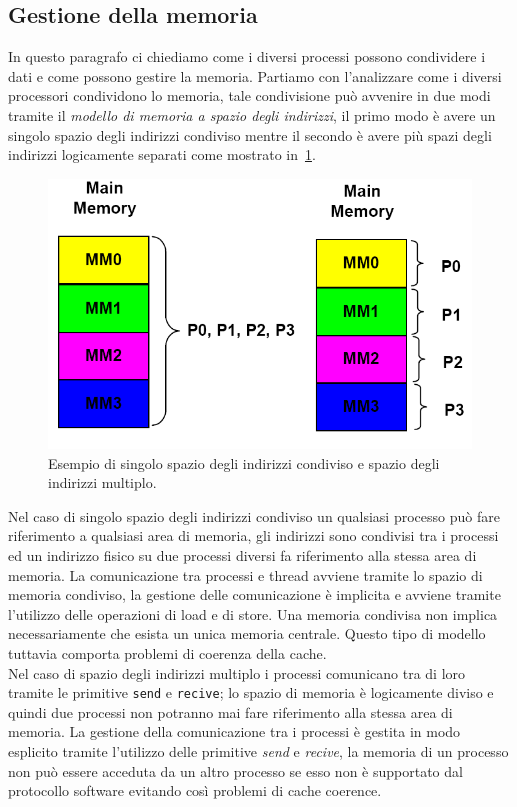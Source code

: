 \subsection{Gestione della memoria}
In questo paragrafo ci chiediamo come i diversi processi possono condividere i dati e come possono gestire la memoria.
Partiamo con l'analizzare come i diversi processori condividono lo memoria, tale condivisione può avvenire in due modi tramite il \emph{modello di memoria a spazio degli indirizzi}, il primo modo è avere un singolo spazio degli indirizzi condiviso mentre il secondo è avere più spazi degli indirizzi logicamente separati come mostrato in \figurename\,\ref{fig:adressspace}.
\begin{figure}[htb]
\centering
\includegraphics[scale=0.5]{img/addressspace.png}
\caption{Esempio di singolo spazio degli indirizzi condiviso e spazio degli indirizzi multiplo.}\label{fig:adressspace}
\end{figure}
Nel caso di singolo spazio degli indirizzi condiviso un qualsiasi processo può fare riferimento a qualsiasi area di memoria, gli indirizzi sono condivisi tra i processi ed un indirizzo fisico su due processi diversi fa riferimento alla stessa area di memoria. La comunicazione tra processi e thread avviene tramite lo spazio di memoria condiviso, la gestione delle comunicazione è implicita e avviene tramite l'utilizzo delle operazioni di load e di store. Una memoria condivisa non implica necessariamente che esista un unica memoria centrale. Questo tipo di modello tuttavia comporta problemi di coerenza della cache.\\
Nel caso di spazio degli indirizzi multiplo i processi comunicano tra di loro tramite le primitive \texttt{send} e \texttt{recive}; lo spazio di memoria è logicamente diviso e quindi due processi non potranno mai fare riferimento alla stessa area di memoria. La gestione della comunicazione tra i processi è gestita in modo esplicito tramite l'utilizzo delle primitive \emph{send} e \emph{recive}, la memoria di un processo non può essere acceduta da un altro processo se esso non è supportato dal protocollo software evitando così problemi di cache coerence.\\
